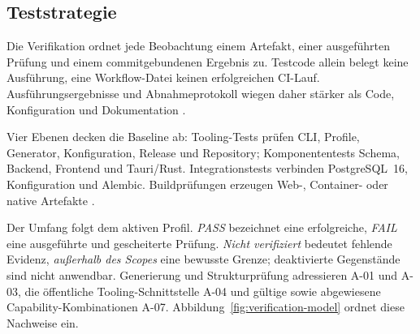 \subsection{Teststrategie}
\label{subsec:teststrategie}

Die Verifikation ordnet jede Beobachtung einem Artefakt, einer ausgeführten
Prüfung und einem commitgebundenen Ergebnis zu. Testcode allein belegt keine
Ausführung, eine Workflow-Datei keinen erfolgreichen CI-Lauf.
Ausführungsergebnisse und Abnahmeprotokoll wiegen daher stärker als Code,
Konfiguration und Dokumentation
\parencite{runeson2009case-study,iso25010-2023}.

Vier Ebenen decken die Baseline ab: Tooling-Tests prüfen CLI, Profile,
Generator, Konfiguration, Release und Repository; Komponententests Schema,
Backend, Frontend und Tauri/Rust. Integrationstests verbinden PostgreSQL~16,
Konfiguration und Alembic. Buildprüfungen erzeugen Web-, Container- oder native
Artefakte \parencite{kleiveist2026ci}.

Der Umfang folgt dem aktiven Profil. \emph{PASS} bezeichnet eine erfolgreiche,
\emph{FAIL} eine ausgeführte und gescheiterte Prüfung. \emph{Nicht verifiziert}
bedeutet fehlende Evidenz, \emph{außerhalb des Scopes} eine bewusste Grenze;
deaktivierte Gegenstände sind nicht anwendbar. Generierung und Strukturprüfung
adressieren A-01 und A-03, die öffentliche Tooling-Schnittstelle A-04 und
gültige sowie abgewiesene Capability-Kombinationen A-07. Abbildung~\ref{fig:verification-model}
ordnet diese Nachweise ein.


